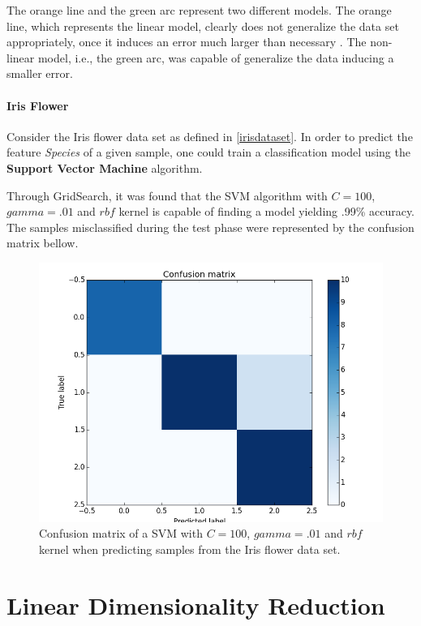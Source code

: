 \documentclass[12pt]{article}
\begin{document}
The orange line and the green arc represent two different models. The orange line, which represents the linear model, clearly does not generalize the data set appropriately, once it induces an error much larger than necessary \cite{roh2015}. The non-linear model, i.e., the green arc, was capable of generalize the data inducing a smaller error.

\paragraph{Iris Flower}

Consider the Iris flower data set as defined in \ref{irisdataset}. In order to predict the feature {\em Species} of a given sample, one could train a classification model using the \textbf{Support Vector Machine} algorithm.

Through GridSearch, it was found that the SVM algorithm with $C=100$, $gamma=.01$ and $rbf$ kernel is capable of finding a model yielding .99\% accuracy. The samples misclassified during the test phase were represented by the confusion matrix bellow.

\begin{figure}[H]
	\centering
	\captionsetup{justification=centering}

	\includegraphics[scale=.5]{svm_cm_iris}
	\caption{Confusion matrix of a SVM with $C=100$, $gamma=.01$ and $rbf$ kernel when predicting samples from the Iris flower data set.}
	\label{fig:cmsvmiris}
\end{figure}

\section{Linear Dimensionality Reduction}
\end{document}
